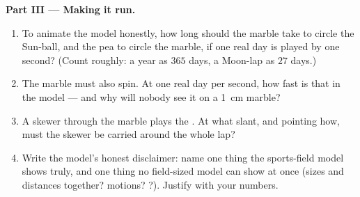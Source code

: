 \begin{problem}
\medskip\noindent\textbf{Part III --- Making it run.}
\begin{enumerate}[resume]
  \item To animate the model honestly, how long should the
        marble take to circle the Sun-ball, and the pea to circle
        the marble, if one real day is played by one second?
        (Count roughly: a year as $365$ days, a Moon-lap as $27$
        days.)
  \item The marble must also spin. At one real day per second,
        how fast is that in the model --- and why will nobody see
        it on a \qty{1}{cm} marble?
  \item A skewer through the marble plays the . At what slant,
        and pointing how, must the skewer be carried around the
        whole lap?
  \item Write the model's honest disclaimer: name one thing the
        sports-field model shows truly, and one thing no
        field-sized model can show at once (sizes and distances
        together? motions? ?). Justify with your numbers.
\end{enumerate}
\end{problem}

